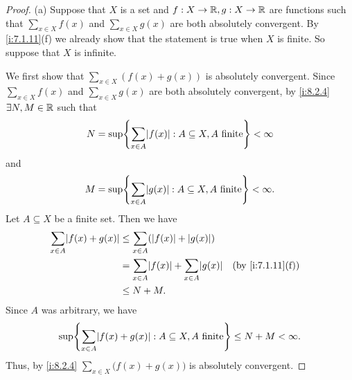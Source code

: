 \begin{proof}{(a)}
  Suppose that \(X\) is a set and \(f : X \to \mathbb{R}, g : X \to \mathbb{R}\) are functions such that \(\sum_{x \in X} f(x)\) and \(\sum_{x \in X} g(x)\) are both absolutely convergent.
  By \cref{i:7.1.11}(f) we already show that the statement is true when \(X\) is finite.
  So suppose that \(X\) is infinite.

  We first show that \(\sum_{x \in X} (f(x) + g(x))\) is absolutely convergent.
  Since \(\sum_{x \in X} f(x)\) and \(\sum_{x \in X} g(x)\) are both absolutely convergent, by \cref{i:8.2.4} \(\exists N, M \in \mathbb{R}\) such that
  \[
    N = \sup\set{\sum_{x \in A} \abs{f(x)} : A \subseteq X, A \text{ finite}} < \infty
  \]
  and
  \[
    M = \sup\set{\sum_{x \in A} \abs{g(x)} : A \subseteq X, A \text{ finite}} < \infty.
  \]
  Let \(A \subseteq X\) be a finite set.
  Then we have
  \begin{align*}
    \sum_{x \in A} \abs{f(x) + g(x)} & \leq \sum_{x \in A} (\abs{f(x)} + \abs{g(x)})                                 \\
                                     & = \sum_{x \in A} \abs{f(x)} + \sum_{x \in A} \abs{g(x)} &  & \by{i:7.1.11}[f] \\
                                     & \leq N + M.
  \end{align*}
  Since \(A\) was arbitrary, we have
  \[
    \sup\set{\sum_{x \in A} \abs{f(x) + g(x)} : A \subseteq X, A \text{ finite}} \leq N + M < \infty.
  \]
  Thus, by \cref{i:8.2.4} \(\sum_{x \in X} \big(f(x) + g(x)\big)\) is absolutely convergent.


\end{proof}
